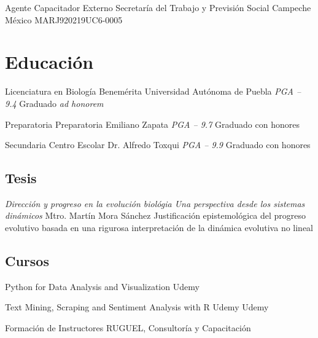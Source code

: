 \documentclass[11pt, letterpaper, roman]{moderncv}
\begin{document}
		{Agente Capacitador Externo}
		{Secretaría del Trabajo y Previsión Social}
		{Campeche}
		{México}
		{MARJ920219UC6-0005}


\section{Educación}

		{Licenciatura en Biología}
		{Benemérita Universidad Autónoma de Puebla}
		{\newline \em PGA -- 9.4}
		{Graduado {\em ad honorem}}
		{}	
		
		{Preparatoria}
		{Preparatoria Emiliano Zapata}
		{\newline \em PGA -- 9.7}
		{Graduado con honores}
		{}
		
		{Secundaria}
		{Centro Escolar Dr. Alfredo Toxqui}
		{\newline \em PGA -- 9.9}
		{Graduado con honores}
		{}

\subsection{Tesis}

  {\em Dirección y progreso en la evolución biológia \newline
  Una perspectiva desde los sistemas dinámicos}
  {Mtro. Martín Mora Sánchez}
  {Justificación epistemológica del progreso evolutivo basada en una 
  rigurosa interpretación de la dinámica evolutiva no lineal}

\subsection{Cursos}

        {Python for Data Analysis and Visualization}
        {Udemy}
        {}
        {}
        {}
        
        {Text Mining, Scraping and Sentiment Analysis with R}
        {Udemy}
        {Udemy}
        {}
        {}

		{Formación de Instructores}
		{\newline RUGUEL, Consultoría y Capacitación}
		{}
		{}
		{}
\end{document}
